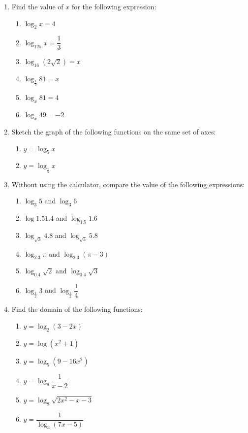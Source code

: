 \documentclass[12pt]{report}
\begin{document}
\begin{multicols}{2}
  \begin{enumerate}
    \item Find the value of $x$ for the following expression:
          \begin{enumerate}
            \item $\log_2 x = 4$
            \item $\log_{125} x = \dfrac{1}{3}$
            \item $\log_{16}(2\sqrt{2}) = x$
            \item $\log_\frac{1}{3}81 = x$
            \item $\log_x 81 = 4$
            \item $\log_x 49 = -2$
          \end{enumerate}

    \item Sketch the graph of the following functions on the same set of axes:
          \begin{enumerate}
            \item $y = \log_5 x$
            \item $y = \log_\frac{1}{5} x$
          \end{enumerate}

    \item Without using the calculator, compare the value of the following expressions:
          \begin{enumerate}
            \item $\log_3 5$ and $\log_3 6$
            \item $\log{1.5} 1.4$ and $\log_{1.5} 1.6$
            \item $\log_{\sqrt{3}} 4.8$ and $\log_{\sqrt{3}} 5.8$
            \item $\log_{2.3} \pi$ and $\log_{2.3} (\pi - 3)$
            \item $\log_{0.4}\sqrt{2}$ and $\log_{0.4}\sqrt{3}$
            \item $\log_\frac{1}{2} 3$ and $\log_\frac{1}{2} \dfrac{1}{4}$
          \end{enumerate}

    \item Find the domain of the following functions:
          \begin{enumerate}
            \item $y = \log_2 (3-2x)$
            \item $y = \log(x^2 + 1)$
            \item $y = \log_5(9-16x^2)$
            \item $y = \log_9 \dfrac{1}{x-2}$
            \item $y = \log_8 \sqrt{2x^2 - x - 3}$
            \item $y = \dfrac{1}{\log_3 (7x-5)}$
          \end{enumerate}
  \end{enumerate}
\end{multicols}
\end{document}
